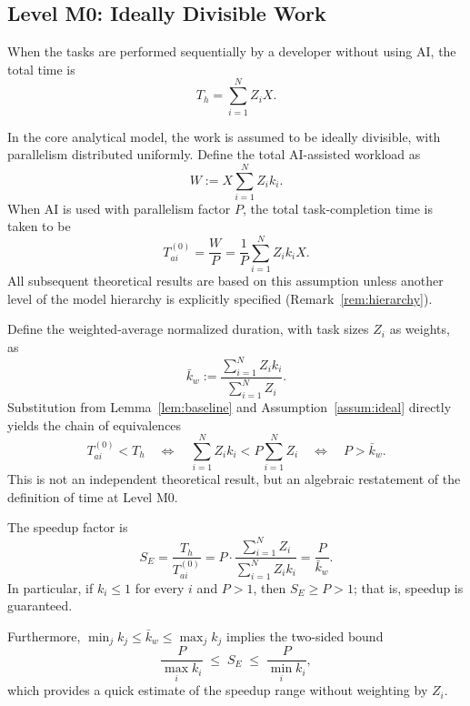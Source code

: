\subsection{Level M0: Ideally Divisible Work}

\begin{lemma}\label{lem:baseline}
When the tasks are performed sequentially by a developer without using AI, the total time is
\begin{equation}
  T_h = \sum_{i=1}^{N} Z_i X.
\end{equation}
\end{lemma}

\begin{assumption}\label{assum:ideal}
In the core analytical model, the work is assumed to be ideally divisible, with parallelism distributed uniformly. Define the total AI-assisted workload as
\[
  W := X \sum_{i=1}^{N} Z_i k_i.
\]
When AI is used with parallelism factor $P$, the total task-completion time is taken to be
\begin{equation}
  T_{ai}^{(0)} = \frac{W}{P} = \frac{1}{P} \sum_{i=1}^{N} Z_i k_i X.
\end{equation}
All subsequent theoretical results are based on this assumption unless another level of the model hierarchy is explicitly specified (Remark~\ref{rem:hierarchy}).
\end{assumption}

\begin{observation}\label{obs:ideal}
Define the weighted-average normalized duration, with task sizes $Z_i$ as weights, as
\[
  \bar{k}_w := \frac{\sum_{i=1}^{N} Z_i k_i}{\sum_{i=1}^{N} Z_i}.
\]
Substitution from Lemma~\ref{lem:baseline} and Assumption~\ref{assum:ideal} directly yields the chain of equivalences
\begin{equation}
  T_{ai}^{(0)} < T_h
  \quad\Longleftrightarrow\quad
  \sum_{i=1}^{N} Z_i k_i < P \sum_{i=1}^{N} Z_i
  \quad\Longleftrightarrow\quad
  P > \bar{k}_w.
\end{equation}
This is not an independent theoretical result, but an algebraic restatement of the definition of time at Level M0.

The speedup factor is
\begin{equation}
  S_E = \frac{T_h}{T_{ai}^{(0)}} = P \cdot \frac{\sum_{i=1}^{N} Z_i}{\sum_{i=1}^{N} Z_i k_i} = \frac{P}{\bar{k}_w}.
\end{equation}
In particular, if $k_i \le 1$ for every $i$ and $P > 1$, then $S_E \ge P > 1$; that is, speedup is guaranteed.

\medskip
Furthermore, $\min_{j} k_j \le \bar{k}_w \le \max_{j} k_j$ implies the two-sided bound
\[
  \frac{P}{\max_{i} k_i} \;\le\; S_E \;\le\; \frac{P}{\min_{i} k_i},
\]
which provides a quick estimate of the speedup range without weighting by $Z_i$.
\end{observation}

